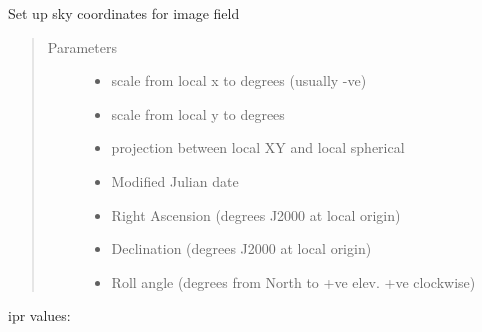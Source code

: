 \documentclass[letterpaper,10pt,english]{sphinxmanual}
\begin{document}
\begin{fulllineitems}
\label{\detokenize{images_functions:images.setsky}}
Set up sky coordinates for image field
\begin{quote}\begin{description}
\item[{Parameters}] \leavevmode\begin{itemize}
\item {} 
 \textendash{} scale from local x to degrees (usually -ve)

\item {} 
 \textendash{} scale from local y to degrees

\item {} 
 \textendash{} projection between local XY and local spherical

\item {} 
 \textendash{} Modified Julian date

\item {} 
 \textendash{} Right Ascension (degrees J2000 at local origin)

\item {} 
 \textendash{} Declination (degrees J2000 at local origin)

\item {} 
 \textendash{} Roll angle (degrees from North to +ve elev. +ve clockwise)

\end{itemize}

\end{description}\end{quote}
\begin{description}
\item[{ipr values:}] \leavevmode
{}

\end{description}

\end{fulllineitems}
\end{document}
